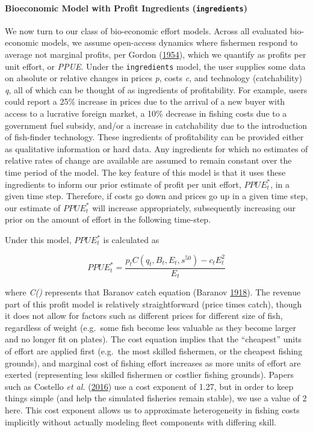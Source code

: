 \documentclass[twoside,12pt,final]{ucthesis-CA2012}
\begin{document}
\begin{ucmainmatter}
\paragraph{\texorpdfstring{Bioeconomic Model with Profit Ingredients
(\texttt{ingredients})}{Bioeconomic Model with Profit Ingredients (ingredients)}}\label{bioeconomic-model-with-profit-ingredients-ingredients}

We now turn to our class of bio-economic effort models. Across all
evaluated bio-economic models, we assume open-access dynamics where
fishermen respond to average not marginal profits, per Gordon
(\protect\hyperlink{ref-Gordon1954}{1954}), which we quantify as profits
per unit effort, or \emph{PPUE}. Under the \texttt{ingredients} model,
the user supplies some data on absolute or relative changes in prices
\emph{p}, costs \emph{c}, and technology (catchability) \emph{q}, all of
which can be thought of as ingredients of profitability. For example,
users could report a 25\% increase in prices due to the arrival of a new
buyer with access to a lucrative foreign market, a 10\% decrease in
fishing costs due to a government fuel subsidy, and/or a increase in
catchability due to the introduction of fish-finder technology. These
ingredients of profitability can be provided either as qualitative
information or hard data. Any ingredients for which no estimates of
relative rates of change are available are assumed to remain constant
over the time period of the model. The key feature of this model is that
it uses these ingredients to inform our prior estimate of profit per
unit effort, \(PPUE_{t}^*\), in a given time step. Therefore, if costs
go down and prices go up in a given time step, our estimate of
\(PPUE_{t}^*\) will increase appropriately, subsequently increasing our
prior on the amount of effort in the following time-step.

Under this model, \(PPUE_{t}^*\) is calculated as

\[PPUE_{t}^* = \frac{p_{t}C(q_{t},B_{t},E_t,s^{50}) - c_{t}E_{t}^2}{E_{t}}\]

where \emph{C()} represents that Baranov catch equation (Baranov
\protect\hyperlink{ref-Baranov1918}{1918}). The revenue part of this
profit model is relatively straightforward (price times catch), though
it does not allow for factors such as different prices for different
size of fish, regardless of weight (e.g.~some fish become less valuable
as they become larger and no longer fit on plates). The cost equation
implies that the ``cheapest'' units of effort are applied first
(e.g.~the most skilled fishermen, or the cheapest fishing grounds), and
marginal cost of fishing effort increases as more units of effort are
exerted (representing less skilled fishermen or costlier fishing
grounds). Papers such as Costello \emph{et al.}
(\protect\hyperlink{ref-Costello2016}{2016}) use a cost exponent of
1.27, but in order to keep things simple (and help the simulated
fisheries remain stable), we use a value of 2 here. This cost exponent
allows us to approximate heterogeneity in fishing costs implicitly
without actually modeling fleet components with differing skill.


\end{ucmainmatter}
\end{document}
